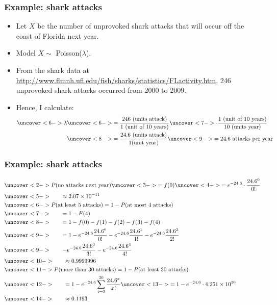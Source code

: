 \documentclass[handout]{beamer}\usepackage{graphicx, color}
\numberwithin{equation}{section}
\begin{document}
\begin{frame}
\frametitle{Example: shark attacks}
\begin{itemize}
\pause \item Let $X$ be the number of unprovoked shark attacks that will occur off the coast of Florida next year.
\pause \item Model $X \sim $ Poisson($\lambda$).
\pause \item From the shark data at \url{http://www.flmnh.ufl.edu/fish/sharks/statistics/FLactivity.htm}, 246 unprovoked shark attacks occurred from 2000 to 2009.
\pause \item Hence, I calculate:
\begin{align*}
\uncover<6->{\lambda} &\uncover<6->{= \frac{246 \text{ (units attack)}}{1 \text{ (unit of 10 years)}}} \uncover<7->{\cdot \frac{1 \text{ (unit of 10 years)}}{10 \text{ (units year)}}} \\
&\uncover<8->{=\frac{24.6 \text{ (units attack)}}{1 \text{(unit year)}}} \uncover<9->{= 24.6 \text{ attacks per year} }
\end{align*}
\end{itemize}
\end{frame}

\begin{frame}
\frametitle{Example: shark attacks} \small

\begin{align*}
&\uncover<2->{P(\text{no attacks next year}) \uncover<3->{=f(0)} \uncover<4->{= e^{-24.6} \cdot \frac{24.6^0}{0!}}} \\
&\uncover<5->{ \qquad \approx 2.07 \times 10^{-11}} \\
&\uncover<6->{P(\text{at least 5 attacks}) = 1 - P(\text{at most 4 attacks})} \\
&\uncover<7->{ \qquad =1 - F(4)} \\
&\uncover<8->{ \qquad =1 - f(0) - f(1) - f(2) - f(3) - f(4)} \\
&\uncover<9->{ \qquad =1 - e^{-24.6} \frac{24.6^0}{0!} - e^{-24.6} \frac{24.6^1}{1!} - e^{-24.6} \frac{24.6^2}{2!}} \\
&\uncover<9->{ \qquad - e^{-24.6} \frac{24.6^3}{3!} - e^{-24.6} \frac{24.6^4}{4!}} \\
&\uncover<10->{\qquad \approx 0.9999996} \\
&\uncover<11->{P(\text{more than 30 attacks}) = 1 - P(\text{at least 30 attacks})} \\
&\uncover<12->{ \qquad= 1 - e^{-24.6} \sum_{i = 0}^{30} \frac{24.6^x}{x!}}  \uncover<13->{= 1 - e^{-24.6} \cdot 4.251 \times 10^{10}} \\
&\uncover<14->{ \qquad \approx 0.1193}
\end{align*}
\end{frame}
\end{document}
